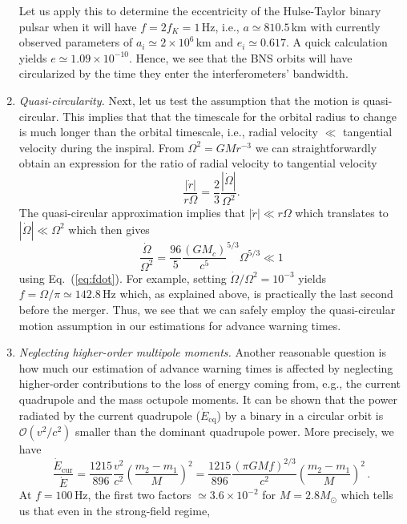 \documentclass[11pt,a4paper]{article}
\newcommand{\f}{\frac}
\newcommand{\be}{\begin{equation}}
\newcommand{\ee}{\end{equation}}
\newcommand{\ord}{\mathcal{O}}
\begin{document}
\begin{enumerate}
Let us apply this to determine the eccentricity of the Hulse-Taylor binary pulsar when it will have $f=2f_K = 1\,$Hz, i.e., 
$a \simeq 810.5\,$km with currently observed parameters of $a_i \simeq 2\times 10^6\,$km and $e_i \simeq 0.617$. 
A quick calculation yields $e\simeq 1.09\times 10^{-10}$. 
Hence, we see that the BNS orbits will have circularized by the time they enter the interferometers' bandwidth.
%
\item {\it Quasi-circularity.}
Next, let us test the assumption that the motion is quasi-circular. 
This implies that that the timescale for the orbital radius to change is much longer than the orbital timescale, i.e., radial velocity $\ll$ tangential velocity during the inspiral. From $\Omega^2 = GM r^{-3}$ we can straightforwardly obtain 
%
%
an expression for the ratio of radial velocity to tangential velocity
%
\be
\f{|\dot{r}|}{r\Omega}=\f{2}{3}\f{|\dot\Omega|}{\Omega^2} \label{eq:ratio_of_radial_vel_to_tang_vel} .
\ee
%
The quasi-circular approximation implies that $|\dot{r}| \ll r\Omega$ which translates to $|\dot\Omega| \ll \Omega^2$ which then gives
%
\be
\f{\dot\Omega}{\Omega^2} = \f{96}{5} \f{(G M_c)}{c^5}^{5/3}\Omega^{5/3} \ll 1 \label{eq:omega_dot_over_omegasq}
\ee
%
using Eq.~(\ref{eq:fdot}). %
For example, setting $\dot{\Omega}/\Omega^2 = 10^{-3}$ yields $f= \Omega/\pi \simeq 142.8\,$Hz which, as explained above, 
is practically the last second before the merger. Thus, we see that we can safely employ the quasi-circular motion assumption in our
estimations for advance warning times.
%
\item {\it Neglecting higher-order multipole moments.}
Another reasonable question is how much our estimation of advance warning times is
affected by neglecting higher-order contributions to the loss of energy coming from, e.g., the current quadrupole and the mass octupole moments.
It can be shown that the power radiated by the current
quadrupole ($\dot{E}_\text{cq}$) by a binary in a circular orbit is $\ord(v^2/c^2)$ smaller than the dominant quadrupole power. More precisely, we have \cite{Maggiore}
%
\be
\f{\dot{E}_\text{cur}}{\dot{E}} = \f{1215}{896} \f{v^2}{c^2}\left(\f{m_2-m_1}{M}\right)^2=\f{1215}{896}\f{(\pi G M f)^{2/3}}{c^2}\left(\f{m_2-m_1}{M}\right)^2\, . \label{eq:Oct_quad_ratio}
\ee
%
At $f=100\,$Hz, the first two factors $\simeq 3.6\times 10^{-2}$ for $M=2.8 M_\odot$ which tells us that even in the strong-field regime, 

\end{enumerate}
\end{document}

